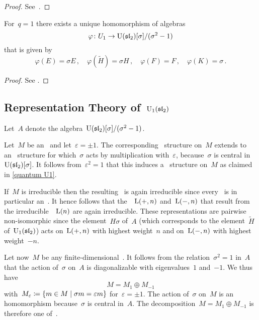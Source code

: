 \documentclass[a4paper, 11pt, oneside]{scrartcl}
\begin{document}
\begin{proof}
 See~{\cite[Proposition~VI.2.1]{kassel_quantum}}.
\end{proof}

\begin{proposition}
  For~$q = 1$ there exists a unique homomorphism of algebras
  \[
    \varphi
    \colon
    U_1
    \to
    \operatorname{U}(\mathfrak{sl}_2)[\sigma]/(\sigma^2 - 1)
  \]
  that is given by
  \[
    \varphi(E) = \sigma E \,,
    \quad
    \varphi(\widetilde{H}) = \sigma H \,,
    \quad
    \varphi(F) = F \,,
    \quad
    \varphi(K) = \sigma \,.
  \]
\end{proposition}

\begin{proof}
  See \cite[Proof of Proposition~VI.2.2]{kassel_quantum}.
\end{proof}





\subsection{Representation Theory of~$\operatorname{U}_1(\mathfrak{sl}_2)$}
\label{representation theory of U1}

Let~$A$ denote the algebra~$\operatorname{U}(\mathfrak{sl}_2)[\sigma]/(\sigma^2 - 1)$.

Let~$M$ be an~ and let~$\varepsilon = \pm 1$.
The corresponding~ structure on~$M$ extends to an~ structure for which~$\sigma$ acts by multiplication with~$\varepsilon$, because~$\sigma$ is central in~$\operatorname{U}(\mathfrak{sl}_2)[\sigma]$.
It follows from~$\varepsilon^2 = 1$ that this induces a~ structure on~$M$ as claimed in \cref{quantum U1}.

If~$M$ is irreducible then the resulting~ is again irreducible since every~ is in particular an~.
It hence follows that the~~$\operatorname{L}(+,n)$ and~$\operatorname{L}(-,n)$ that result from the irreducible~~$\operatorname{L}(n)$ are again irreducible.
These representations are pairwise non-isomorphic since the element~$H \sigma$ of~$A$ (which corresponds to the element~$\widetilde{H}$ of~$\operatorname{U}_1(\mathfrak{sl}_2)$) acts on~$\operatorname{L}(+,n)$ with highest weight~$n$ and on~$\operatorname{L}(-,n)$ with highest weight~$-n$.

Let now~$M$ be any finite-dimensional~.
It follows from the relation~$\sigma^2 = 1$ in~$A$ that the action of~$\sigma$ on~$A$ is diagonalizable with eigenvalues~$1$ and~$-1$.
We thus have
\[
  M = M_{1} \oplus M_{-1}
\]
with~$M_\varepsilon \defined \{ m \in M \suchthat \sigma m = \varepsilon m \}$ for~$\varepsilon = \pm 1$.
The action of~$\sigma$ on~$M$ is an~ homomorphism because~$\sigma$ is central in~$A$.
The decomposition~$M = M_{1} \oplus M_{-1}$ is therefore one of~.
\end{document}
